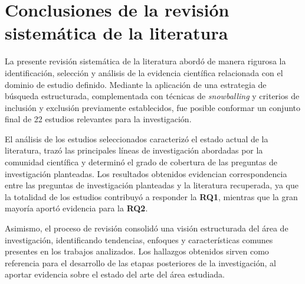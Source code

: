 \section{Conclusiones de la revisión sistemática de la literatura}

La presente revisión sistemática de la literatura abordó de manera rigurosa la identificación, selección y análisis de la evidencia científica relacionada con el dominio de estudio definido. Mediante la aplicación de una estrategia de búsqueda estructurada, complementada con técnicas de \textit{snowballing} y criterios de inclusión y exclusión previamente establecidos, fue posible conformar un conjunto final de 22 estudios relevantes para la investigación.

El análisis de los estudios seleccionados caracterizó el estado actual de la literatura, trazó las principales líneas de investigación abordadas por la comunidad científica y determinó el grado de cobertura de las preguntas de investigación planteadas. Los resultados obtenidos evidencian correspondencia entre las preguntas de investigación planteadas y la literatura recuperada, ya que la totalidad de los estudios contribuyó a responder la \textbf{RQ1}, mientras que la gran mayoría aportó evidencia para la \textbf{RQ2}.

Asimismo, el proceso de revisión consolidó una visión estructurada del área de investigación, identificando tendencias, enfoques y características comunes presentes en los trabajos analizados. Los hallazgos obtenidos sirven como referencia para el desarrollo de las etapas posteriores de la investigación, al aportar evidencia sobre el estado del arte del área estudiada.
